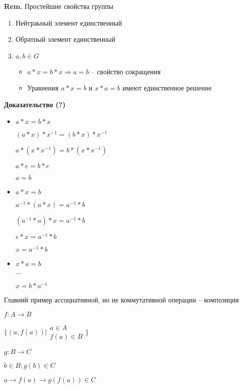 \documentclass[14pt, letter paper]{article}
\begin{document}
\textbf{Rem.} Простейшие свойства группы

\begin{enumerate}
    \item Нейтраьный элемент единственный
    \item Обратный элемент единственный
    \item $a, b \in G$
    \begin{itemize}
        \item $a*x = b*x \Rightarrow a = b$ -- свойство сокращения
        \item Уравнения $a * x = b$ и $x * a = b$ имеют единственное решение
    \end{itemize}
\end{enumerate}

\begin{center}
    \textbf{Доказательство (?)}
\end{center}

\begin{itemize}
    \item $a*x=b*x$

    $(a*x)*x^{-1} = (b*x)*x^{-1}$

    $a*(x*x^{-1}) = b * (x*x^{-1})$

    $a*e=b*e$

    $a = b$

    \item $a*x=b$

    $a^{-1}*(a*x) = a^{-1}*b$
    
    $(a^{-1}*a)*x = a^{-1}*b$

    $e*x=a^{-1}*b$

    $x = a^{-1} * b$

    \item $x*a=b$

    $\cdots$

    $x = b * a^{-1}$
\end{itemize}

Главний пример ассоциативной, но не коммутативной операции -- композиция

$f:A \rightarrow B$

$\{ (a, f(a)) | \begin{gathered} a \in A \\ f(a) \in B \end{gathered}\}$

$g:B \rightarrow C$

$b \in B; g(b) \in C$

$a \rightarrow f(a) \rightarrow g(f(a)) \in C$
\end{document}
